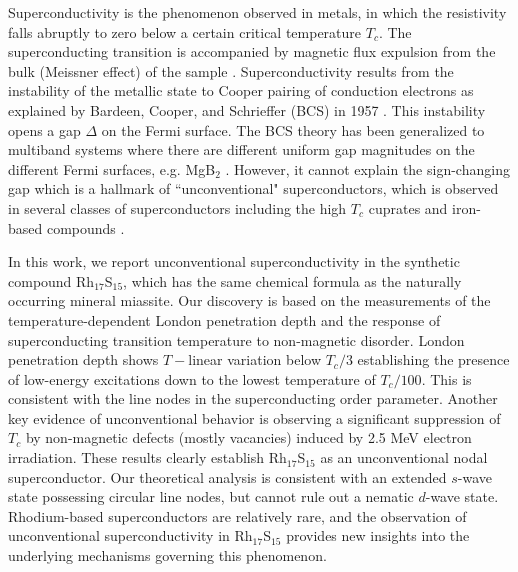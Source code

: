 \documentclass[aps,pra,reprint,superscriptaddress,floatfix]{revtex4-2}
\begin{document}
Superconductivity is the phenomenon observed in metals, in which the resistivity falls abruptly to zero below a certain critical temperature $T_c$.
The superconducting transition is accompanied by magnetic flux expulsion from the bulk (Meissner effect) of the sample \cite{Meissner1933}.  
Superconductivity results from the instability of the metallic state to Cooper pairing of conduction electrons as explained by Bardeen, Cooper, and Schrieffer (BCS) in 1957 \cite{Bardeen1957}. This instability opens a gap $\Delta$ on the Fermi surface.
The BCS theory has been generalized to multiband systems where there are different uniform gap magnitudes on the different Fermi surfaces, e.g. MgB$_2$  \cite{Bouquet2001, Canfield2003}. However, it cannot explain the sign-changing gap which is a hallmark of ``unconventional" superconductors, which is observed in several classes of superconductors including the high $T_c$ cuprates \cite{Hardy1993} and iron-based compounds \cite{Hicks2009}. 

In this work, we report unconventional superconductivity in the synthetic compound Rh$_{17}$S$_{15}$, which has the same chemical formula as the naturally occurring mineral miassite. 
Our discovery is based on the measurements of the temperature-dependent London penetration depth and the response of superconducting transition temperature to non-magnetic disorder. London penetration depth shows $T-$linear variation below $T_c/3$ establishing the presence of low-energy excitations down to the lowest temperature of $T_c/100$. This is consistent with the line nodes in the superconducting order parameter. Another key evidence of unconventional behavior is observing a significant suppression of $T_c$ by non-magnetic defects (mostly vacancies) induced by 2.5 MeV electron irradiation.
These results clearly establish Rh$_{17}$S$_{15}$ as an unconventional nodal superconductor. 
Our theoretical analysis is consistent with an extended $s$-wave state possessing circular line nodes, but cannot rule out a nematic $d$-wave state.
Rhodium-based superconductors are relatively rare, and the observation of unconventional superconductivity in Rh$_{17}$S$_{15}$ provides new insights into the underlying mechanisms governing this phenomenon.
\end{document}
